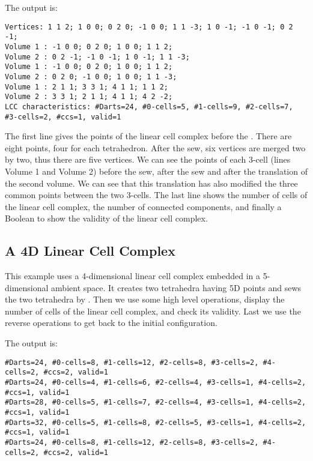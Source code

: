 
The output is:
\begin{verbatim}
Vertices: 1 1 2; 1 0 0; 0 2 0; -1 0 0; 1 1 -3; 1 0 -1; -1 0 -1; 0 2 -1; 
Volume 1 : -1 0 0; 0 2 0; 1 0 0; 1 1 2; 
Volume 2 : 0 2 -1; -1 0 -1; 1 0 -1; 1 1 -3; 
Volume 1 : -1 0 0; 0 2 0; 1 0 0; 1 1 2; 
Volume 2 : 0 2 0; -1 0 0; 1 0 0; 1 1 -3; 
Volume 1 : 2 1 1; 3 3 1; 4 1 1; 1 1 2; 
Volume 2 : 3 3 1; 2 1 1; 4 1 1; 4 2 -2; 
LCC characteristics: #Darts=24, #0-cells=5, #1-cells=9, #2-cells=7, #3-cells=2, #ccs=1, valid=1
\end{verbatim}

The first line gives the points of the linear cell complex before the
. There are eight points, four for each tetrahedron.
After the sew, six vertices are merged two by two, thus there are five
vertices. We can see the points of each 3-cell (lines Volume 1 and
Volume 2) before the sew, after the sew and after the translation of
the second volume.  We can see that this translation has also modified
the three common points between the two 3-cells.  The last line shows
the number of cells of the linear cell complex, the number of
connected components, and finally a Boolean to show the validity of
the linear cell complex.

\subsection{A 4D Linear Cell Complex}\label{ssec-5dexample}

This example uses a 4-dimensional linear cell complex embedded in a
5-dimensional ambient space.  It creates two tetrahedra having 5D
points and sews the two tetrahedra by \betaquatre{}. Then we use some high
level operations, display the number of cells of the linear cell
complex, and check its validity.  Last we use the reverse operations
to get back to the initial configuration.


The output is:
\begin{verbatim}
#Darts=24, #0-cells=8, #1-cells=12, #2-cells=8, #3-cells=2, #4-cells=2, #ccs=2, valid=1
#Darts=24, #0-cells=4, #1-cells=6, #2-cells=4, #3-cells=1, #4-cells=2, #ccs=1, valid=1
#Darts=28, #0-cells=5, #1-cells=7, #2-cells=4, #3-cells=1, #4-cells=2, #ccs=1, valid=1
#Darts=32, #0-cells=5, #1-cells=8, #2-cells=5, #3-cells=1, #4-cells=2, #ccs=1, valid=1
#Darts=24, #0-cells=8, #1-cells=12, #2-cells=8, #3-cells=2, #4-cells=2, #ccs=2, valid=1
\end{verbatim}

